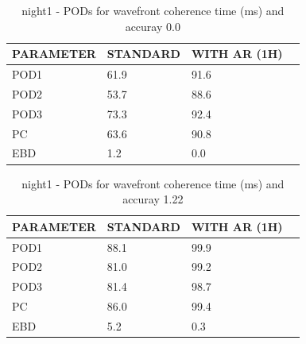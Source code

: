 \begin{table}[p!]
\begin{center}
\begin{tabular}{|l|l|l|l|}
\hline
\multicolumn{1}{|c|}{\cellcolor[HTML]{C0C0C0}\textbf{PARAMETER}} & \multicolumn{1}{c|}{\cellcolor[HTML]{C0C0C0}\textbf{STANDARD}} & \multicolumn{1}{c|}{\cellcolor[HTML]{C0C0C0}\textbf{WITH AR (1H)}} \\
\hline
\cellcolor[HTML]{C0C0C0}POD1  & 61.9                                & 91.6         \\
\cellcolor[HTML]{C0C0C0}POD2  & 53.7                                & 88.6         \\
\cellcolor[HTML]{C0C0C0}POD3  & 73.3                                & 92.4         \\
\cellcolor[HTML]{C0C0C0}PC    & 63.6                                  & 90.8           \\
\cellcolor[HTML]{C0C0C0}EBD   & 1.2                                 & 0.0          \\
\hline
\end{tabular}
\caption{night1 - PODs for wavefront coherence time (ms) and accuray 0.0}
\label{tab:podtau0.0:night1}
\end{center}
\end{table}
\begin{table}[p!]
\begin{center}
\begin{tabular}{|l|l|l|l|}
\hline
\multicolumn{1}{|c|}{\cellcolor[HTML]{C0C0C0}\textbf{PARAMETER}} & \multicolumn{1}{c|}{\cellcolor[HTML]{C0C0C0}\textbf{STANDARD}} & \multicolumn{1}{c|}{\cellcolor[HTML]{C0C0C0}\textbf{WITH AR (1H)}} \\
\hline
\cellcolor[HTML]{C0C0C0}POD1  & 88.1                                & 99.9         \\
\cellcolor[HTML]{C0C0C0}POD2  & 81.0                                & 99.2         \\
\cellcolor[HTML]{C0C0C0}POD3  & 81.4                                & 98.7         \\
\cellcolor[HTML]{C0C0C0}PC    & 86.0                                  & 99.4           \\
\cellcolor[HTML]{C0C0C0}EBD   & 5.2                                 & 0.3          \\
\hline
\end{tabular}
\caption{night1 - PODs for wavefront coherence time (ms) and accuray 1.22}
\label{tab:podtau1.22:night1}
\end{center}
\end{table}

